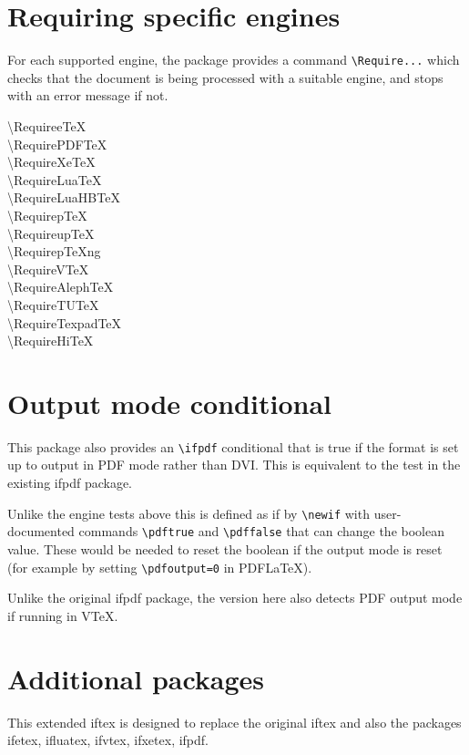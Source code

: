 \documentclass{article}
\newcommand\cs[1]{{\ttfamily\textbackslash #1}}
\begin{document}
\section{Requiring specific engines}
For each supported engine, the package provides a command
\verb|\Require...| which checks that the document is being processed
with a suitable engine, and stops with an error message if not.

\begin{description}
\item[\cs{RequireeTeX}]
\item[\cs{RequirePDFTeX}]
\item[\cs{RequireXeTeX}]
\item[\cs{RequireLuaTeX}]
\item[\cs{RequireLuaHBTeX}]
\item[\cs{RequirepTeX}]
\item[\cs{RequireupTeX}]
\item[\cs{RequirepTeXng}]
\item[\cs{RequireVTeX}]
\item[\cs{RequireAlephTeX}]
\item[\cs{RequireTUTeX}]
\item[\cs{RequireTexpadTeX}]
\item[\cs{RequireHiTeX}]
\end{description}


\section{Output mode conditional}
This package also provides an \verb|\ifpdf| conditional that is true
if the format is set up to output in PDF mode rather than DVI. This is
equivalent to the test in the existing \textsf{ifpdf} package.

Unlike the engine tests above this is defined as if by \verb|\newif|
with user-documented commands \verb|\pdftrue| and \verb|\pdffalse| that can
change the boolean value. These would be needed to reset the boolean
if the output mode is reset (for example by setting
\verb|\pdfoutput=0| in PDF\LaTeX).

Unlike the original \textsf{ifpdf} package, the version here also
detects PDF output mode if running in V\TeX.

\section{Additional packages}
This extended \textsf{iftex} is designed to replace the original
\textsf{iftex} and also the packages
\textsf{ifetex},
\textsf{ifluatex},
\textsf{ifvtex},
\textsf{ifxetex},
\textsf{ifpdf}.
\end{document}
